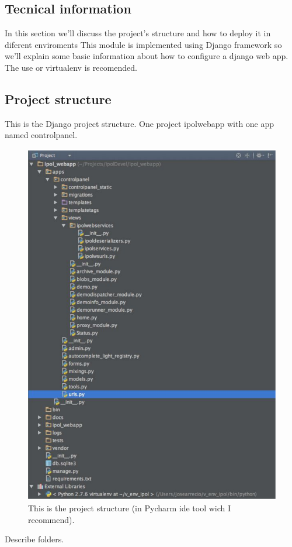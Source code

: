 \subsection{Tecnical information}
In this section we'll discuss the project's structure and how to deploy it in diferent enviroments
This module is implemented using Django framework so we'll explain some basic information about how to configure a django web app.
The use or virtualenv is recomended.

\subsection{Project structure}
This is the Django project structure.
One project ipolwebapp with one app named controlpanel.


\begin{figure}[!ht]
\centering
\includegraphics[width=0.5\columnwidth]{control_panel/images/ipol_webapp_project.pdf}
\caption{This is the project structure (in Pycharm ide tool wich I recommend). } 
\label{fi:proxy_example}
\end{figure}
Describe folders.

